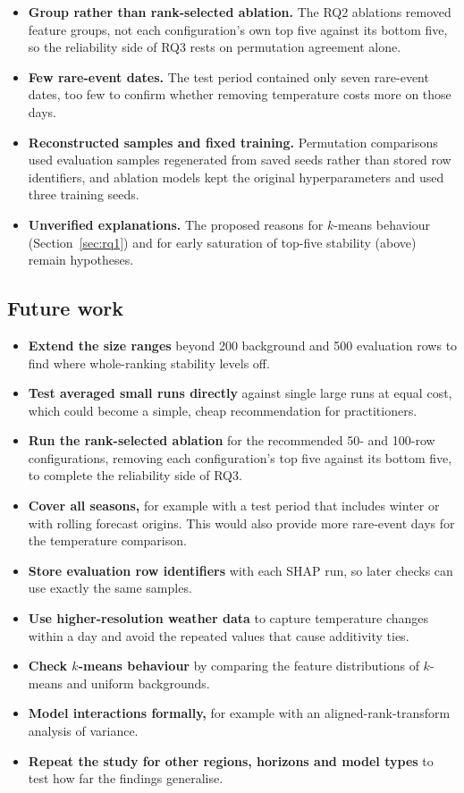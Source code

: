 \documentclass[11pt,a4paper]{article}
\begin{document}
\begin{itemize}
  \item \textbf{Group rather than rank-selected ablation.} The RQ2 ablations removed feature groups, not each configuration's own top five against its bottom five, so the reliability side of RQ3 rests on permutation agreement alone.
  \item \textbf{Few rare-event dates.} The test period contained only seven rare-event dates, too few to confirm whether removing temperature costs more on those days.
  \item \textbf{Reconstructed samples and fixed training.} Permutation comparisons used evaluation samples regenerated from saved seeds rather than stored row identifiers, and ablation models kept the original hyperparameters and used three training seeds.
  \item \textbf{Unverified explanations.} The proposed reasons for $k$-means behaviour (Section~\ref{sec:rq1}) and for early saturation of top-five stability (above) remain hypotheses.
\end{itemize}

\subsection{Future work}

\begin{itemize}
  \item \textbf{Extend the size ranges} beyond 200 background and 500 evaluation rows to find where whole-ranking stability levels off.
  \item \textbf{Test averaged small runs directly} against single large runs at equal cost, which could become a simple, cheap recommendation for practitioners.
  \item \textbf{Run the rank-selected ablation} for the recommended 50- and 100-row configurations, removing each configuration's top five against its bottom five, to complete the reliability side of RQ3.
  \item \textbf{Cover all seasons,} for example with a test period that includes winter or with rolling forecast origins. This would also provide more rare-event days for the temperature comparison.
  \item \textbf{Store evaluation row identifiers} with each SHAP run, so later checks can use exactly the same samples.
  \item \textbf{Use higher-resolution weather data} to capture temperature changes within a day and avoid the repeated values that cause additivity ties.
  \item \textbf{Check $k$-means behaviour} by comparing the feature distributions of $k$-means and uniform backgrounds.
  \item \textbf{Model interactions formally,} for example with an aligned-rank-transform analysis of variance.
  \item \textbf{Repeat the study for other regions, horizons and model types} to test how far the findings generalise.
\end{itemize}
\end{document}
